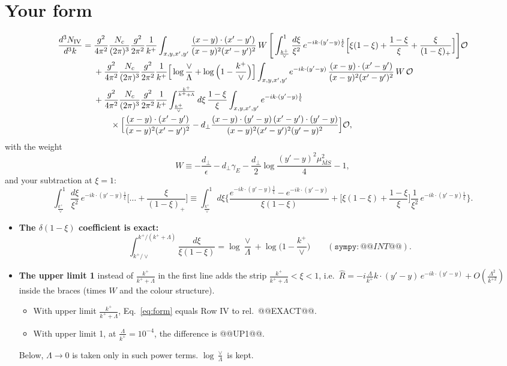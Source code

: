 \documentclass[10pt]{article}
\numberwithin{equation}{section}
\newcommand{\OO}{\mathcal O}
\newcommand{\pre}{\frac{g^{2}}{4\pi^{2}}\frac{N_{c}}{(2\pi)^{3}}\frac{g^{2}}{2\pi^{2}}\frac{1}{k^{+}}}
\newcommand{\XX}{\frac{(x-y)\cdot(x'-y')}{(x-y)^{2}(x'-y')^{2}}}
\newcommand{\ph}{e^{-ik\cdot(y'-y)\frac{1}{\xi}}}
\newcommand{\phone}{e^{-ik\cdot(y'-y)}}
\begin{document}
\section{Your form}\label{sec:form}
\begin{align}
\frac{d^{3}N_{\rm IV}}{d^{3}k}={}&\pre\int_{x,y,x',y'}\XX\,W\,\Bigg[\int_{\frac{k^{+}}{\vee}}^{1}\frac{d\xi}{\xi^{2}}\,\ph\Big[\xi(1-\xi)+\frac{1-\xi}{\xi}+\frac{\xi}{(1-\xi)_{+}}\Big]\Bigg]\OO\notag\\
&+\pre\Big[\log\frac{\vee}{\Lambda}+\log\Big(1-\frac{k^{+}}{\vee}\Big)\Big]\int_{x,y,x',y'}\phone\,\XX\,W\,\OO\notag\\
&+\pre\int_{\frac{k^{+}}{\vee}}^{\frac{k^{+}}{k^{+}+\Lambda}}d\xi\,\frac{1-\xi}{\xi}\int_{x,y,x',y'}\ph\notag\\
&\qquad\times\Big[\XX-d_\perp\frac{(x-y)\cdot(y'-y)\,(x'-y')\cdot(y'-y)}{(x-y)^{2}(x'-y')^{2}(y'-y)^{2}}\Big]\OO ,
\label{eq:form}
\end{align}
with the weight
\begin{equation}
W\equiv-\frac{d_{\perp}}{\epsilon}-d_{\perp}\gamma_{E}-\frac{d_{\perp}}{2}\log\frac{(y'-y)^{2}\mu^{2}_{\overline{MS}}}{4}-1 ,
\end{equation}
and your subtraction at $\xi=1$:
\begin{equation}
\int_{\frac{k^{+}}{\vee}}^{1}\frac{d\xi}{\xi^{2}}\,\ph\Big[\dots+\frac{\xi}{(1-\xi)_{+}}\Big]\equiv\int_{\frac{k^{+}}{\vee}}^{1}d\xi\bigg\{\frac{\ph-\phone}{\xi(1-\xi)}+\Big[\xi(1-\xi)+\frac{1-\xi}{\xi}\Big]\frac{1}{\xi^2}\,\ph\bigg\}.
\label{eq:usub}
\end{equation}
\begin{itemize}
\item \textbf{The $\delta(1-\xi)$ coefficient is exact:}
\begin{equation*}
\int_{k^+/\vee}^{k^+/(k^++\Lambda)}\frac{d\xi}{\xi(1-\xi)}=\log\frac{\vee}{\Lambda}+\log\Big(1-\frac{k^+}{\vee}\Big)\qquad(\texttt{sympy}: @@INT@@).
\end{equation*}
\item \textbf{The upper limit 1} instead of $\frac{k^+}{k^++\Lambda}$ in the first line adds the strip $\frac{k^+}{k^++\Lambda}<\xi<1$, i.e.\ $\hat R=-i\frac{\Lambda}{k^+}k\cdot(y'-y)\,e^{-ik\cdot(y'-y)}+O(\frac{\Lambda^2}{k^{+2}})$ inside the braces (times $W$ and the colour structure).
\begin{itemize}
\item With upper limit $\frac{k^+}{k^++\Lambda}$, Eq.~\eqref{eq:form} equals Row IV to rel.\ @@EXACT@@.
\item With upper limit 1, at $\frac{\Lambda}{k^+}=10^{-4}$, the difference is @@UP1@@.
\end{itemize}
Below, $\Lambda\to0$ is taken only in such power terms. $\log\frac{\vee}{\Lambda}$ is kept.
\end{itemize}
\end{document}
